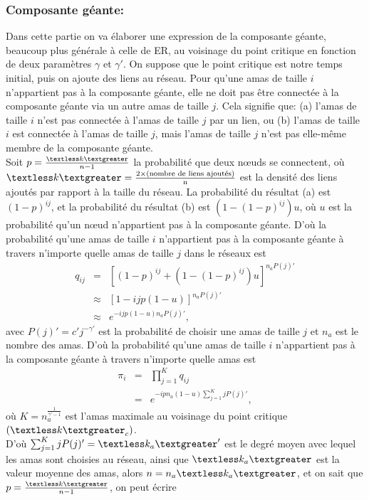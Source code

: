 \subsubsection{Composante géante:}
Dans cette partie on va élaborer une expression de la composante géante, beaucoup plus générale à celle de ER, au voisinage du point critique en fonction de deux paramètres $\gamma$ et $\gamma'$.
On suppose que le point critique est notre temps initial, puis on ajoute des liens au réseau.
Pour qu'une amas de taille $i$ n'appartient pas à la composante géante, elle ne doit pas être connectée à la composante géante via un autre amas de taille $j$. Cela signifie que: (a) l'amas de taille $i$ n'est pas connectée à l'amas de taille $j$ par un lien, ou (b) l'amas  de taille $i$ est connectée à l'amas de taille $j$, mais l'amas de taille $j$ n'est pas elle-même membre de la composante géante.\\
Soit $p=\frac{\km}{n-1}$ la probabilité que deux nœuds se connectent, où 
$\km=\frac{2\times\text{(nombre de liens ajoutés)}}{\text{n}}$ est la densité des liens ajoutés par rapport à la taille du réseau.
La probabilité du résultat (a) est $(1-p)^{ij}$, et la probabilité du résultat (b) est $(1-(1-p)^{ij})u$, où $u$ est la probabilité qu'un nœud n'appartient pas à la composante géante. D'où la probabilité qu'une amas de taille $i$ n'appartient pas à la composante géante à travers n'importe quelle amas de taille $j$  dans le réseaux est
\begin{eqnarray}
q_{ij}&=&[(1-p)^{ij}+(1-(1-p)^{ij})u]^{n_aP(j)'}\nonumber\\
&\approx&[1-ijp(1-u)]^{n_aP(j)'}\nonumber\\
&\approx&e^{-ijp(1-u)n_aP(j)'},
\end{eqnarray}
 avec $P(j)'=c'j^{-\gamma'}$ est la probabilité de choisir une amas de taille $j$ et $n_a$ est le nombre des amas.
D'où la probabilité qu'une amas de taille $i$ n'appartient pas à la composante géante à travers n'importe quelle amas est
\begin{eqnarray}
\pi_{i}&=&\prod_{j=1}^{K}q_{ij}\nonumber\\
       &=&e^{-ipn_a(1-u)\sum_{j=1}^{K}jP(j)'},
\end{eqnarray}
où $K=n_a^{\frac{1}{\gamma'-1}}$ est l'amas maximale au voisinage du point critique $(\km_c)$.\\ D'où $\sum_{j=1}^{K}jP(j)'=\kma'$ est le degré moyen avec lequel les amas sont choisies au réseau, ainsi que $\kma$ est la valeur moyenne des amas, alors $n=n_a\kma$, et on sait que $p=\frac{\km}{n-1}$, on peut écrire
